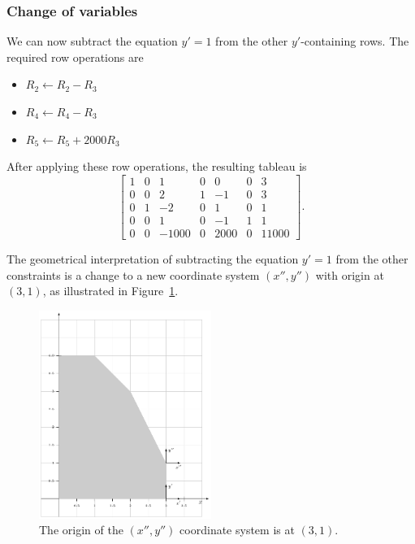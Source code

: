 \documentclass[11pt,oneside]{article}
\begin{document}
		
	\subsubsection{Change of variables}
	
		We can now subtract the equation $y'=1$ from the other $y'$-containing rows.
		The required row operations are
		\begin{itemize}
			\item $R_2 \gets R_2 - R_3$
			\item $R_4 \gets R_4 - R_3$
			\item $R_5 \gets R_5 + 2000R_3$
		\end{itemize}		
		After applying these row operations, the resulting tableau is
		\[
		\left[
		\begin{array}{rrrrrr|r}
		1& 0&     1& 0&    0& 0&     3      \\ 
		0& 0&     2& 1&   -1& 0&     3      \\ 
		0& 1&    -2& 0&    1& 0&     1      \\ 
		0& 0&     1& 0&   -1& 1&     1      \\ 
		0& 0& -1000& 0& 2000& 0& 11000      
		\end{array}
		\right].		
		\]
		
		\noindent
		The geometrical interpretation of subtracting the equation $y'=1$ from the other constraints
		is a change to a new coordinate system $(x'',y'')$ with origin at $(3,1)$,
		as illustrated in Figure~\ref{fig:linear_programming_3}.
		
		\begin{figure}[htb]
		\begin{center}
		\includegraphics[width=0.5\textwidth]{figures/linear_algebra/linear_programming_3.pdf}
		\end{center}
		\vspace{-6mm}
		\caption{The origin of the $(x'',y'')$ coordinate system is at $(3,1)$.}
		\label{fig:linear_programming_3}
		\end{figure}
\end{document}

